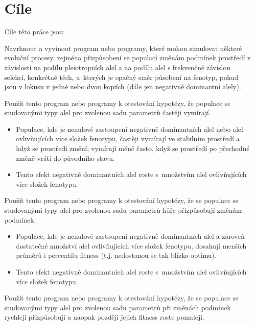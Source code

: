 \chapter{Cíle}


Cíle této práce jsou:


\begin{enumerate}
    \item{Navrhnout a vyvinout program nebo programy, které mohou simulovat některé evoluční procesy, zejména přizpůsobení
    se populací změnám podmínek prostředí v závislosti na podílu pleiotropních alel a na podílu alel s frekvenčně
    závislou selekcí, konkrétně těch, u~kterých je opačný směr působení na fenotyp, pokud jsou v lokusu v jedné nebo
    dvou kopiích (dále jen negativně dominantní alely).
    \item{Použít tento program nebo programy k otestování hypotézy, že populace se studovanými typy alel  pro zvolenou
         sadu parametrů častěji vymírají.}
        \begin{itemize}
            \item{Populace, kde je nenulové zastoupení negativně dominantních alel nebo
                  alel ovlivňujících více složek fenotypu, častěji vymírají ve stabilním
                  prostředí a když se prostředí změní; vymírají méně často, když se prostředí
                  po přechodné změně vrátí do původního stavu.}
            \item{Tento efekt negativně dominantních alel roste s množstvím alel ovlivňujících více složek fenotypu.}
        \end{itemize}
    }
    \item{Použít tento program nebo programy k otestování hypotézy, že se populace se studovanými typy alel pro zvolenou
         sadu parametrů hůře přizpůsobují změnám podmínek.
        \begin{itemize}
            \item{Populace, kde je nenulové zastoupení negativně dominantních alel a zároveň dostatečné množství
                       alel ovlivňujících více složek fenotypu, dosahují menších průměrů i percentilu fitness (t.j.
                       nedostanou se tak blízko optimu).}
            \item{Tento efekt negativně dominantních alel roste s množstvím alel ovlivňujících více složek fenotypu.}
        \end{itemize}
    }
    \item{Použít tento program nebo programy k otestování hypotézy, že se populace se studovanými typy alel pro zvolenou
         sadu parametrů při změnách podmínek rychleji přizpůsobují a naopak později jejich fitness roste pomaleji.

}
\end{enumerate}
